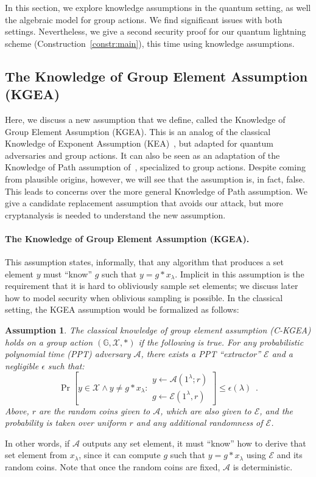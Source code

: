 \documentclass{article}\usepackage[a4paper,margin=20mm]{geometry}
\newtheorem{assumption}[theorem]{Assumption}
\numberwithin{theorem}{section}
\numberwithin{equation}{section}
\newcommand{\G}{\mathbb{G}}
\newcommand{\As}{{\mathcal{A}}}
\newcommand{\Es}{{\mathcal{E}}}
\newcommand{\Xs}{{\mathcal{X}}}
\begin{document}
In this section, we explore knowledge assumptions in the quantum setting, as well the algebraic model for group actions. We find significant issues with both settings. Nevertheless, we give a second security proof for our quantum lightning scheme (Construction~\ref{constr:main}), this time using knowledge assumptions.

\subsection{The Knowledge of Group Element Assumption (KGEA)}

Here, we discuss a new assumption that we define, called the Knowledge of Group Element Assumption (KGEA). This is an analog of the classical Knowledge of Exponent Assumption (KEA)~\cite{C:Damgard91}, but adapted for quantum adversaries and group actions. It can also be seen as an adaptation of the Knowledge of Path assumption of~\cite{EC:LiuMonZha23}, specialized to group actions. Despite coming from plausible origins, however, we will see that the assumption is, in fact, false. This leads to concerns over the more general Knowledge of Path assumption. We give a candidate replacement assumption that avoids our attack, but more cryptanalysis is needed to understand the new assumption.

\paragraph{The Knowledge of Group Element Assumption (KGEA).} This assumption states, informally, that any algorithm that produces a set element $y$ must ``know'' $g$ such that $y=g*x_\lambda$. Implicit in this assumption is the requirement that it is hard to obliviously sample set elements; we discuss later how to model security when oblivious sampling is possible. In the classical setting, the KGEA assumption would be formalized as follows:

\begin{assumption}\label{def:ckgea} The \emph{classical knowledge of group element assumption} (C-KGEA) holds on a group action $(\G,\Xs,*)$ if the following is true. For any probabilistic polynomial time (PPT) adversary $\As$, there exists a PPT ``extractor'' $\Es$ and a negligible $\epsilon$ such that:
	\[\Pr\left[y\in\Xs\wedge y\neq g*x_\lambda:\substack{y\gets\As(1^\lambda; r)\\g\gets\Es(1^\lambda,r)}\right]\leq\epsilon(\lambda)\enspace .\]
	Above, $r$ are the random coins given to $\As$, which are also given to $\Es$, and the probability is taken over uniform $r$ and any additional randomness of $\Es$.
\end{assumption}
In other words, if $\As$ outputs any set element, it must ``know'' how to derive that set element from $x_\lambda$, since it can compute $g$ such that $y=g*x_\lambda$ using $\Es$ and its random coins. Note that once the random coins are fixed, $\As$ is deterministic. 
\end{document}
